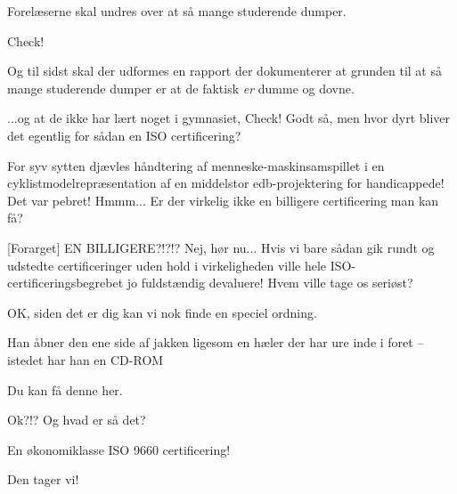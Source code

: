 \documentclass[danish]{article}
\begin{document}
\begin{sketch}
Forelæserne skal undres over at så mange studerende dumper.

 Check!

 Og til sidst skal der udformes en rapport der dokumenterer
at grunden til at så mange studerende dumper er at de faktisk
\emph{er} dumme og dovne.

 ...og at de ikke har lært noget i gymnasiet, Check!  Godt
så, men hvor dyrt bliver det egentlig for sådan en ISO certificering?


 For syv sytten djævles håndtering af
menneske-maskinsamspillet i en cyklistmodelrepræsentation af en
middelstor edb-projektering for handicappede! Det var pebret! Hmmm...
Er der virkelig ikke en billigere certificering man kan få?

 [Forarget] EN BILLIGERE?!?!? Nej, hør nu... Hvis vi bare
sådan gik rundt og udstedte certificeringer uden hold i virkeligheden
ville hele ISO-certificeringsbegrebet jo fuldstændig devaluere! Hvem
ville tage os seriøst?


 OK, siden det er dig kan vi nok finde en speciel
ordning.

\scene Han åbner den ene side af jakken ligesom en hæler der har ure
inde i foret -- istedet har han en CD-ROM

 Du kan få denne her.


 Ok?!? Og hvad er så det?

 En økonomiklasse ISO 9660 certificering!

 Den tager vi! 


\end{sketch}
\end{document}
